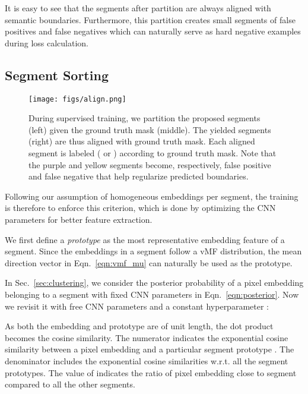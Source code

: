\documentclass[10pt,twocolumn,letterpaper]{article}
\begin{document}
It is easy to see that the segments after partition are always aligned with semantic boundaries.
Furthermore, this partition creates small segments of false positives and false negatives which can naturally serve as hard negative examples during loss calculation.



\subsection{Segment Sorting}
\label{sec:training}

\begin{figure}[t]
    \centering
    \texttt{[image: figs/align.png]}
    \caption{During supervised training, we partition the proposed segments (left) given the ground truth mask (middle). The yielded segments (right) are thus aligned with ground truth mask. Each aligned segment is labeled ( or ) according to ground truth mask. Note that the purple and yellow segments become, respectively, false positive and false negative that help regularize predicted boundaries.}
    \label{fig:align}
\end{figure}






Following our assumption of homogeneous embeddings per segment, the training is therefore to enforce this criterion, which is done by optimizing the CNN parameters for better feature extraction.


We first define a {\it prototype} as the most representative embedding feature of a segment. Since the embeddings in a segment follow a vMF distribution, the mean direction vector  in Eqn.~\ref{eqn:vmf_mu} can naturally be used as the prototype.


In Sec.~\ref{sec:clustering}, we consider 
the posterior probability of a pixel embedding  belonging to a segment  with fixed CNN parameters in Eqn.~\ref{eqn:posterior}. Now we revisit it with free CNN parameters  and a constant hyperparameter :

As both the embedding  and prototype  are of unit length, the dot product  becomes the cosine similarity.
The numerator indicates the exponential cosine similarity between a pixel embedding  and a particular segment prototype .
The denominator includes the exponential cosine similarities w.r.t. all the segment prototypes.
The value of  indicates the ratio of pixel embedding  close to segment  compared to all the other segments.
\end{document}
